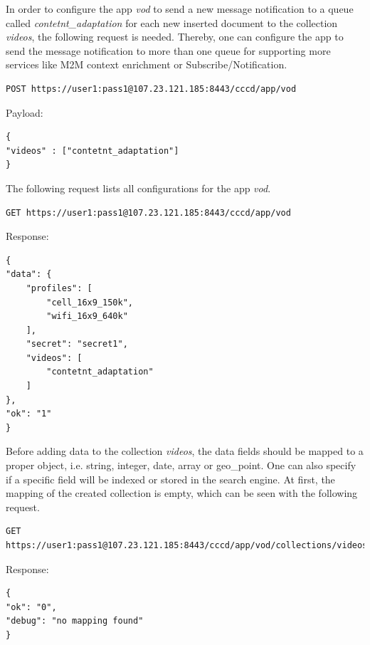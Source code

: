 In order to configure the app \textit{vod} to send a new message notification to a queue called \textit{contetnt\_adaptation} for each new inserted document to the collection \textit{videos}, the following request is needed. Thereby, one can configure the app to send the message notification to more than one queue for supporting more services like M2M context enrichment or Subscribe/Notification.

\begin{code}
\begin{verbatim}
POST https://user1:pass1@107.23.121.185:8443/cccd/app/vod
\end{verbatim}
Payload:
\begin{verbatim}
{
"videos" : ["contetnt_adaptation"]
}
\end{verbatim}
\end{code}

The following request lists all configurations for the app \textit{vod}.

\begin{code}
\begin{verbatim}
GET https://user1:pass1@107.23.121.185:8443/cccd/app/vod
\end{verbatim}
Response:
\begin{verbatim}
{
"data": {
	"profiles": [
		"cell_16x9_150k",
		"wifi_16x9_640k"
	],
	"secret": "secret1",
	"videos": [
		"contetnt_adaptation"
	]
},
"ok": "1"
}
\end{verbatim}
\end{code}

Before adding data to the collection \textit{videos}, the data fields should be mapped to a proper object, i.e. string, integer, date, array or geo\_point. One can also specify if a specific field will be indexed or stored in the search engine. At first, the mapping of the created collection is empty, which can be seen with the following request.

\begin{code}
\begin{verbatim}
GET https://user1:pass1@107.23.121.185:8443/cccd/app/vod/collections/videos/mapping
\end{verbatim}
Response:
\begin{verbatim}
{
"ok": "0",
"debug": "no mapping found"
}
\end{verbatim}
\end{code}

